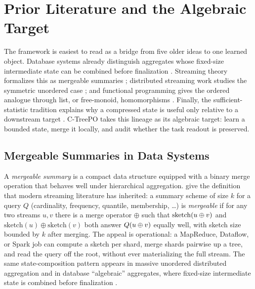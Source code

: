 \section{Prior Literature and the Algebraic Target}\label{sec:mergeable-sketches}

The framework is easiest to read as a bridge from five older ideas to one
learned object. Database systems already distinguish aggregates whose
fixed-size intermediate state can be combined before finalization
\citep{GrayEtAl1997DataCube}. Streaming theory formalizes this as
mergeable summaries \citep{Agarwal2013MergeableTODS}; distributed
streaming work studies the symmetric unordered case
\citep{FeldmanEtAl2008MUD}; and functional programming gives the ordered
analogue through list, or free-monoid, homomorphisms
\citep{Gibbons1996ThirdHomomorphism}. Finally, the sufficient-statistic
tradition explains why a compressed state is useful only relative to a
downstream target \citep{Fisher1922,Blackwell1953}. C-TreePO takes this
lineage as its algebraic target: learn a bounded state, merge it locally,
and audit whether the task readout is preserved.

\subsection{Mergeable Summaries in Data Systems}

A \emph{mergeable summary} is a compact data structure equipped with a
binary merge operation that behaves well under hierarchical aggregation.
\citet{Agarwal2013MergeableTODS} give the definition that modern streaming
literature has inherited: a summary scheme of size $k$ for a query $Q$
(cardinality, frequency, quantile, membership, \dots) is \emph{mergeable}
if for any two streams $u, v$ there is a merge operator $\oplus$ such that
$\mathrm{sketch}(u \oplus v)$ and
$\mathrm{sketch}(u) \oplus \mathrm{sketch}(v)$ both answer $Q(u \oplus v)$
equally well, with sketch size bounded by $k$ after merging. The appeal is
operational: a MapReduce, Dataflow, or Spark job can compute a sketch per
shard, merge shards pairwise up a tree, and read the query off the root,
without ever materializing the full stream. The same state-composition
pattern appears in massive unordered distributed aggregation and in database
``algebraic'' aggregates, where fixed-size intermediate state is combined
before finalization \citep{FeldmanEtAl2008MUD,GrayEtAl1997DataCube}.

